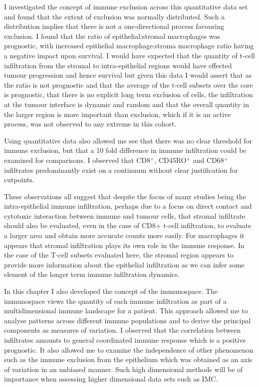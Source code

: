 I investigated the concept of immune exclusion across this quantitative data set and found that the extent of exclusion was normally distributed. Such a distribution implies that there is not a one-directional process favouring exclusion. I found that the ratio of epithelial:stromal macrophages was prognostic, with increased epithelial macrophage:stroma macrophage ratio having a negative impact upon survival. I would have expected that the quantity of t-cell infiltration from the stromal to intra-epithelial regions would have effected tumour progression and hence survival but given this data I would assert that as the ratio is not prognostic and that the average of the t-cell subsets over the core is prognostic, that there is no explicit long term exclusion of cells, the infiltration at the tumour interface is dynamic and random and that the overall quantity in the larger region is more important than exclusion, which if it is an active process, was not observed to any extreme in this cohort.

Using quantitative data also allowed me see that there was no clear threshold for immune exclusion, but that a 10 fold difference in immune infiltration could be examined for comparisons. I observed that CD8$^+$,  CD45RO$^+$ and  CD68$^+$  infiltrates predominantly exist on a continuum without clear justification for cutpoints.

These observations all suggest that despite the focus of many studies being the intra-epithelial immune infiltration, perhaps due to a focus on direct contact and cytotoxic interaction between immune and tumour cells, that stromal infiltrate should also be evaluated, even in the case of CD8+ t-cell infiltration, to evaluate a larger area and obtain more accurate counts more easily. For macrophages it appears that stromal infiltration plays its own role in the immune response. In the case of the T-cell subsets evaluated here, the stromal region appears to provide more information about the epithelial infiltration as we can infer some element of the longer term immune infiltration dynamics.

In this chapter I also developed the concept of the immunospace. The immunospace views the quantity of each immune infiltration as part of a multidimensional immune landscape for a patient. This approach allowed me to analyse patterns across different immune populations and to derive the principal components as measures of variation. I observed that the correlation between infiltrates amounts to general coordinated immune response which is a positive prognostic. It also allowed me to examine the independence of other phenomenon such as the immune exclusion from the epithelium which was obtained as an axis of variation in an unbiased manner. Such high dimensional methods will be of importance when assessing higher dimensional data sets such as IMC. 


